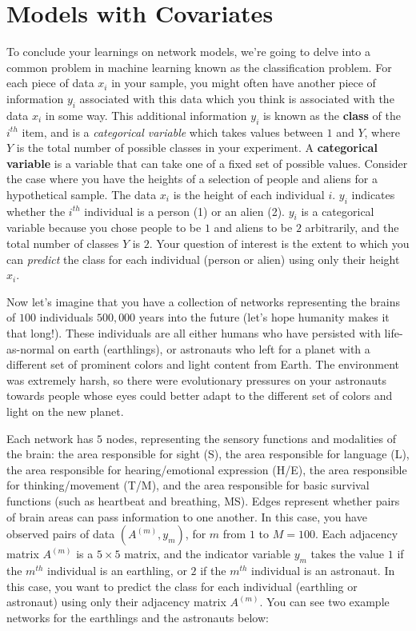 \section{Models with Covariates}
\label{sec:ch5:multicovar}


To conclude your learnings on network models, we're going to delve into a common problem in machine learning known as the classification problem. For each piece of data $x_i$ in your sample, you might often have another piece of information $y_i$ associated with this data which you think is associated with the data $x_i$ in some way. This additional information $y_i$ is known as the \textbf{class} of the $i^{th}$ item, and is a \textit{categorical variable} which takes values between $1$ and $Y$, where $Y$ is the total number of possible classes in your experiment. A \textbf{categorical variable} is a variable that can take one of a fixed set of possible values. Consider the case where you have the heights of a selection of people and aliens for a hypothetical sample. The data $x_i$ is the height of each individual $i$. $y_i$ indicates whether the $i^{th}$ individual is a person (1) or an alien (2). $y_i$ is a categorical variable because you chose people to be $1$ and aliens to be $2$ arbitrarily, and the total number of classes $Y$ is $2$. Your question of interest is the extent to which you can \textit{predict} the class for each individual (person or alien) using only their height $x_i$. 

Now let's imagine that you have a collection of networks representing the brains of $100$ individuals $500,000$ years into the future (let's hope humanity makes it that long!). These individuals are all either humans who have persisted with life-as-normal on earth (earthlings), or astronauts who left for a planet with a different set of prominent colors and light content from Earth. The environment was extremely harsh, so there were evolutionary pressures on your astronauts towards people whose eyes could better adapt to the different set of colors and light on the new planet. 

Each network has $5$ nodes, representing the sensory functions and modalities of the brain: the area responsible for sight (S), the area responsible for language (L), the area responsible for hearing/emotional expression (H/E), the area responsible for thinking/movement (T/M), and the area responsible for basic survival functions (such as heartbeat and breathing, MS). Edges represent whether pairs of brain areas can pass information to one another. In this case, you have observed pairs of data $(A^{(m)}, y_m)$, for $m$ from $1$ to $M=100$. Each adjacency matrix $A^{(m)}$ is a $5 \times 5$ matrix, and the indicator variable $y_m$ takes the value $1$ if the $m^{th}$ individual is an earthling, or $2$ if the $m^{th}$ individual is an astronaut. In this case, you want to predict the class for each individual (earthling or astronaut) using only their adjacency matrix $A^{(m)}$. You can see two example networks for the earthlings and the astronauts below:

